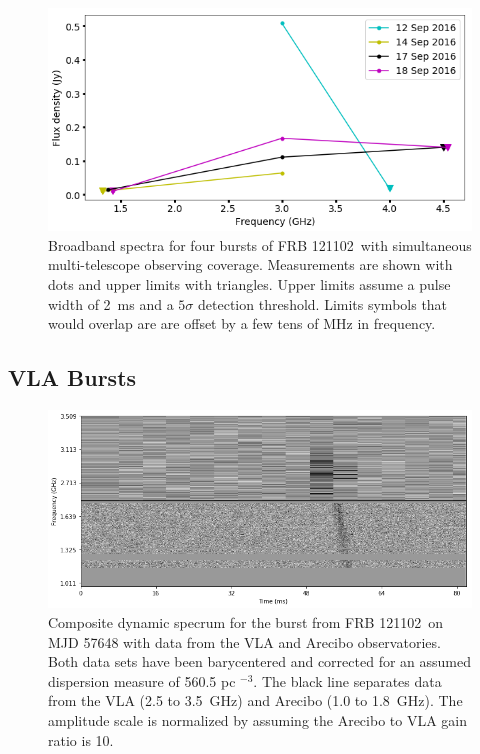 \documentclass[twocolumn]{aastex61}
\newcommand{\frb}{FRB 121102}
\begin{document}
\begin{figure}[htb]
\begin{center}
 \includegraphics[width=\columnwidth]{multispec.png}
 \caption{Broadband spectra for four bursts of \frb\ with simultaneous multi-telescope observing coverage. Measurements are shown with dots and upper limits with triangles. Upper limits assume a pulse width of 2~ms and a $5\sigma$ detection threshold. Limits symbols that would overlap are are offset by a few tens of MHz in frequency.
 \label{fig:multi}}
\end{center}
\end{figure}


\subsection{VLA Bursts}

\begin{figure}[htb]
\begin{center}
 \includegraphics[width=1.9\columnwidth]{aovla_spec.png}
 \caption{Composite dynamic specrum for the burst from \frb\ on MJD 57648 with data from the VLA and Arecibo observatories. Both data sets have been barycentered and corrected for an assumed dispersion measure of 560.5 pc $^{-3}$. The black line separates data from the VLA (2.5 to 3.5~GHz) and Arecibo (1.0 to 1.8~GHz). The amplitude scale is normalized by assuming the Arecibo to VLA gain ratio is 10.
 \label{fig:sgram}}
\end{center}
\end{figure}
\end{document}

